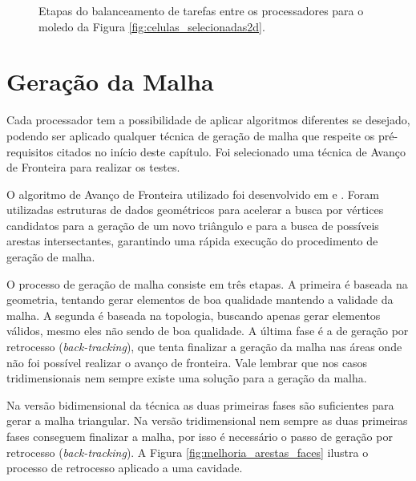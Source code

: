 \begin{figure}[!ht]
{	}
	\caption{Etapas do balanceamento de tarefas entre os processadores para o moledo da Figura \ref{fig:celulas_selecionadas2d}.}
	\label{fig:balanceamento_esfera}
\end{figure}


\section{Geração da Malha}
\label{sec:Geracao_da_Malha}

Cada processador tem a possibilidade de aplicar algoritmos diferentes se desejado, podendo ser aplicado qualquer técnica de geração de malha que respeite os pré-requisitos citados no início deste capítulo. Foi selecionado uma técnica de Avanço de Fronteira para realizar os testes.

O algoritmo de Avanço de Fronteira utilizado foi desenvolvido em \cite{bib:Miranda99} e \cite{bib:Cavalcante-Neto01}. Foram utilizadas estruturas de dados geométricos para acelerar a busca por vértices candidatos para a geração de um novo triângulo e para a busca de possíveis arestas intersectantes, garantindo uma rápida execução do procedimento de geração de malha.

O processo de geração de malha consiste em três etapas. A primeira é baseada na geometria, tentando gerar elementos de boa qualidade mantendo a validade da malha. A segunda é baseada na topologia, buscando apenas gerar elementos válidos, mesmo eles não sendo de boa qualidade. A última fase é a de geração por retrocesso (\textit{back-tracking}), que tenta finalizar a geração da malha nas áreas onde não foi possível realizar o avanço de fronteira. Vale lembrar que nos casos tridimensionais nem sempre existe uma solução para a geração da malha.

Na versão bidimensional da técnica as duas primeiras fases são suficientes para gerar a malha triangular. Na versão tridimensional nem sempre as duas primeiras fases conseguem finalizar a malha, por isso é necessário o passo de geração por retrocesso (\textit{back-tracking}). A Figura \ref{fig:melhoria_arestas_faces} ilustra o processo de retrocesso aplicado a uma cavidade.


